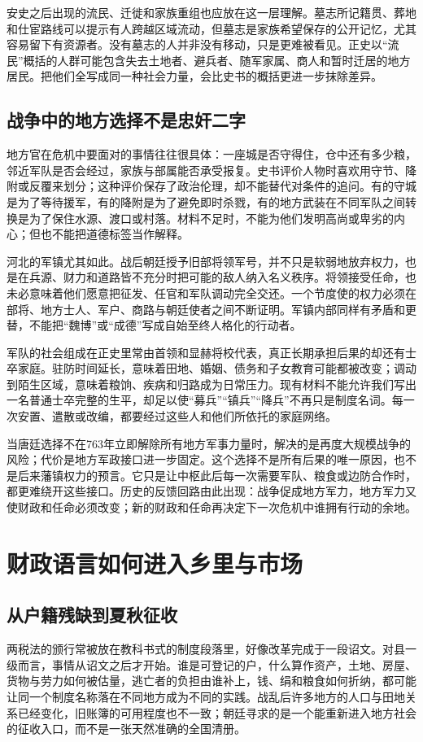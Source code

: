 安史之后出现的流民、迁徙和家族重组也应放在这一层理解。墓志所记籍贯、葬地和仕宦路线可以提示有人跨越区域流动，但墓志是家族希望保存的公开记忆，尤其容易留下有资源者。没有墓志的人并非没有移动，只是更难被看见。正史以“流民”概括的人群可能包含失去土地者、避兵者、随军家属、商人和暂时迁居的地方居民。把他们全写成同一种社会力量，会比史书的概括更进一步抹除差异。

\subsection{战争中的地方选择不是忠奸二字}
地方官在危机中要面对的事情往往很具体：一座城是否守得住，仓中还有多少粮，邻近军队是否会经过，家族与部属能否承受报复。史书评价人物时喜欢用守节、降附或反覆来划分；这种评价保存了政治伦理，却不能替代对条件的追问。有的守城是为了等待援军，有的降附是为了避免即时杀戮，有的地方武装在不同军队之间转换是为了保住水源、渡口或村落。材料不足时，不能为他们发明高尚或卑劣的内心；但也不能把道德标签当作解释。

河北的军镇尤其如此。战后朝廷授予旧部将领军号，并不只是软弱地放弃权力，也是在兵源、财力和道路皆不充分时把可能的敌人纳入名义秩序。将领接受任命，也未必意味着他们愿意把征发、任官和军队调动完全交还。一个节度使的权力必须在部将、地方士人、军户、商路与朝廷使者之间不断证明。军镇内部同样有矛盾和更替，不能把“魏博”或“成德”写成自始至终人格化的行动者。

军队的社会组成在正史里常由首领和显赫将校代表，真正长期承担后果的却还有士卒家庭。驻防时间延长，意味着田地、婚姻、债务和子女教育可能都被改变；调动到陌生区域，意味着粮饷、疾病和归路成为日常压力。现有材料不能允许我们写出一名普通士卒完整的生平，却足以使“募兵”“镇兵”“降兵”不再只是制度名词。每一次安置、遣散或改编，都要经过这些人和他们所依托的家庭网络。

当唐廷选择不在763年立即解除所有地方军事力量时，解决的是再度大规模战争的风险；代价是地方军政接口进一步固定。这个选择不是所有后果的唯一原因，也不是后来藩镇权力的预言。它只是让中枢此后每一次需要军队、粮食或边防合作时，都更难绕开这些接口。历史的反馈回路由此出现：战争促成地方军力，地方军力又使财政和任命必须改变；新的财政和任命再决定下一次危机中谁拥有行动的余地。

\section{财政语言如何进入乡里与市场}

\subsection{从户籍残缺到夏秋征收}
两税法的颁行常被放在教科书式的制度段落里，好像改革完成于一段诏文。对县一级而言，事情从诏文之后才开始。谁是可登记的户，什么算作资产，土地、房屋、货物与劳力如何被估量，逃亡者的负担由谁补上，钱、绢和粮食如何折纳，都可能让同一个制度名称落在不同地方成为不同的实践。战乱后许多地方的人口与田地关系已经变化，旧账簿的可用程度也不一致；朝廷寻求的是一个能重新进入地方社会的征收入口，而不是一张天然准确的全国清册。

